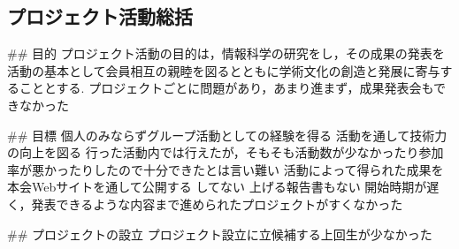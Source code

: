 \subsection*{プロジェクト活動総括}


## 目的
プロジェクト活動の目的は，情報科学の研究をし，その成果の発表を活動の基本として会員相互の親睦を図るとともに学術文化の創造と発展に寄与することとする.
    プロジェクトごとに問題があり，あまり進まず，成果発表会もできなかった

## 目標
個人のみならずグループ活動としての経験を得る
活動を通して技術力の向上を図る
    行った活動内では行えたが，そもそも活動数が少なかったり参加率が悪かったりしたので十分できたとは言い難い
活動によって得られた成果を本会Webサイトを通して公開する
    してない
    上げる報告書もない
    開始時期が遅く，発表できるような内容まで進められたプロジェクトがすくなかった

## プロジェクトの設立
    プロジェクト設立に立候補する上回生が少なかった
